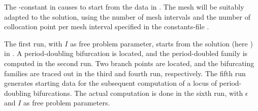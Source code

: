 \documentclass[12pt]{report}
\def\eps{\epsilon}
\begin{document}
The \AUTO-constant  in 
causes \AUTO to start from the data in .
The mesh will be suitably adapted to the solution, using the number of
mesh intervals  and the number of collocation point per mesh
interval  specified in the constants-file .

The first run, with $I$ as free problem parameter,
starts from the solution (here ) in .
A period-doubling bifurcation is located, and the period-doubled family
is computed in the second run.
Two branch points are located, and the bifurcating
families are traced out in the third and fourth run, respectively.
The fifth run generates starting data for the subsequent computation of
a locus of period-doubling bifurcations.
The actual computation is done in the sixth run, with $\eps$ and $I$
as free problem parameters.
\end{document}
